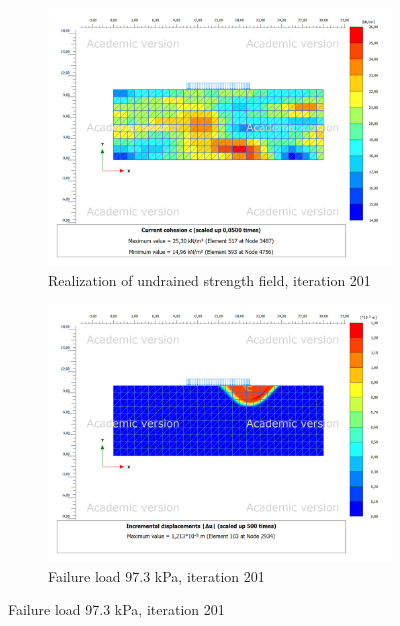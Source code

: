 \begin{figure}
\centering
\begin{subfigure}{0.475\textwidth}
    \centering
    \includegraphics[width=\textwidth]{fig/bc/nx/testp20211116-101822}
    \caption[Network2]%
    {{\small Realization of undrained strength field, iteration 201}}
    \label{fig:bc net14}
\end{subfigure}
\hfill
\begin{subfigure}{0.475\textwidth}
    \centering
    \includegraphics[width=\textwidth]{fig/bc/nx/testutot20211116-1018220.0972879216409623}
    \caption[]%
    {{\small Failure load 97.3 kPa, iteration 201}}
    \label{fig:bc net24}
\end{subfigure}

\end{figure}

